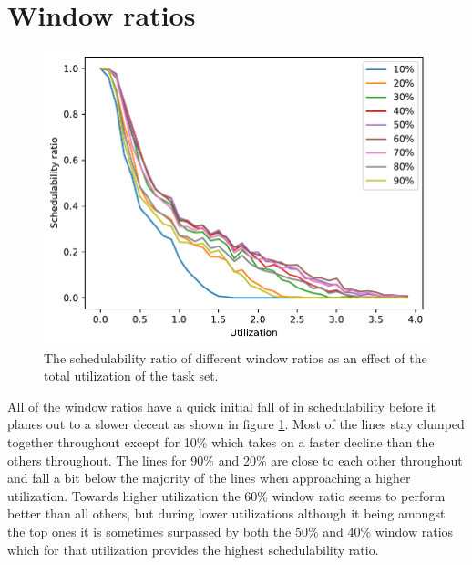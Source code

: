 \documentclass{kththesis}
\begin{document}
\section{Window ratios}\label{sec:result_window_ratios}

\begin{figure}[H]

    \centering

    \includegraphics[width=1.0\linewidth]{images/window_ratio.pdf}

    \caption{The schedulability ratio of different window ratios as an effect of the total
        utilization of the task set.}

    \label{fig:window_ratio}

\end{figure}

All of the window ratios have a quick initial fall of in schedulability before it planes out to a
slower decent as shown in figure \ref{fig:window_ratio}. Most of the lines stay clumped together
throughout except for 10\% which takes on a faster decline than the others throughout. The lines for
90\% and 20\% are close to each other throughout and fall a bit below the majority of the lines when
approaching a higher utilization.  Towards higher utilization the 60\% window ratio seems to perform
better than all others, but during lower utilizations although it being amongst the top ones it is
sometimes surpassed by both the 50\% and 40\% window ratios which for that utilization provides the
highest schedulability ratio.
\end{document}
